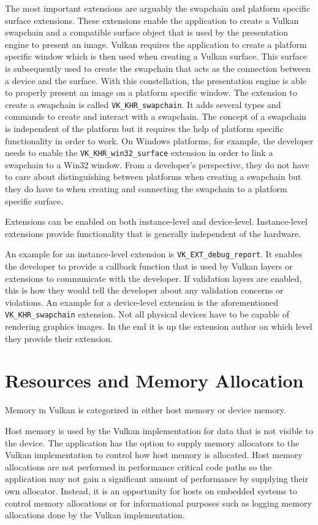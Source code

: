     The most important extensions are arguably the swapchain and platform specific surface extensions. These extensions enable the application to create a Vulkan swapchain and a compatible surface object that is used by the presentation engine to present an image. Vulkan requires the application to create a platform specific window which is then used when creating a Vulkan surface. This surface is subsequently used to create the swapchain that acts as the connection between a device and the surface. With this constellation, the presentation engine is able to properly present an image on a platform specific window. The extension to create a swapchain is called \lstinline{VK_KHR_swapchain}. It adds several types and commands to create and interact with a swapchain. The concept of a swapchain is independent of the platform but it requires the help of platform specific functionality in order to work. On Windows platforms, for example, the developer needs to enable the \lstinline{VK_KHR_win32_surface} extension in order to link a swapchain to a Win32 window. From a developer's perspective, they do not have to care about distinguishing between platforms when creating a swapchain but they do have to when creating and connecting the swapchain to a platform specific surface.

    Extensions can be enabled on both instance-level and device-level. Instance-level extensions provide functionality that is generally independent of the hardware.

    An example for an instance-level extension is \lstinline{VK_EXT_debug_report}. It enables the developer to provide a callback function that is used by Vulkan layers or extensions to communicate with the developer. If validation layers are enabled, this is how they would tell the developer about any validation concerns or violations. An example for a device-level extension is the aforementioned \lstinline{VK_KHR_swapchain} extension. Not all physical devices have to be capable of rendering graphics images. In the end it is up the extension author on which level they provide their extension.

  \section{Resources and Memory Allocation}
  \label{sec:MemoryManagement}
    Memory in Vulkan is categorized in either host memory or device memory.

    Host memory is used by the Vulkan implementation for data that is not visible to the device. The application has the option to supply memory allocators to the Vulkan implementation to control how host memory is allocated. Host memory allocations are not performed in performance critical code paths so the application may not gain a significant amount of performance by supplying their own allocator. Instead, it is an opportunity for hosts on embedded systems to control memory allocations or for informational purposes such as logging memory allocations done by the Vulkan implementation.

